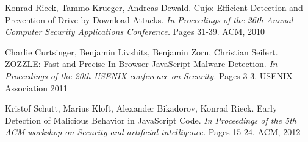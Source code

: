 \begin{thebibliography}{10}
 Konrad Rieck, Tammo Krueger, Andreas Dewald. Cujo: Efficient Detection and Prevention of Drive-by-Download Attacks. {\it In Proceedings of the 26th Annual Computer Security Applications Conference.} Pages 31-39. ACM, 2010

 Charlie Curtsinger, Benjamin Livshits, Benjamin Zorn, Christian Seifert. ZOZZLE: Fast and Precise In-Browser JavaScript Malware Detection. {\it In Proceedings of the 20th USENIX conference on Security.} Pages 3-3. USENIX Association 2011

 Kristof Schutt, Marius Kloft, Alexander Bikadorov, Konrad Rieck. Early Detection of Malicious Behavior in JavaScript Code. {\it In Proceedings of the 5th ACM workshop on Security and artificial intelligence.} Pages 15-24. ACM, 2012

\end{thebibliography}
